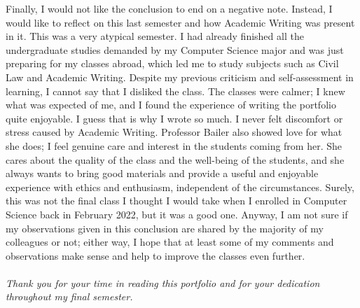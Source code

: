 Finally, I would not like the conclusion to end on a negative note. Instead, I would like to reflect on this last semester and how Academic Writing was present in it. This was a very atypical semester. I had already finished all the undergraduate studies demanded by my Computer Science major and was just preparing for my classes abroad, which led me to study subjects such as Civil Law and Academic Writing. Despite my previous criticism and self-assessment in learning, I cannot say that I disliked the class. The classes were calmer; I knew what was expected of me, and I found the experience of writing the portfolio quite enjoyable. I guess that is why I wrote so much. I never felt discomfort or stress caused by Academic Writing. Professor Bailer also showed love for what she does; I feel genuine care and interest in the students coming from her. She cares about the quality of the class and the well-being of the students, and she always wants to bring good materials and provide a useful and enjoyable experience with ethics and enthusiasm, independent of the circumstances. Surely, this was not the final class I thought I would take when I enrolled in Computer Science back in February 2022, but it was a good one. Anyway, I am not sure if my observations given in this conclusion are shared by the majority of my colleagues or not; either way, I hope that at least some of my comments and observations make sense and help to improve the classes even further. 
\\ \\
\textit{Thank you for your time in reading this portfolio and for your dedication throughout my final semester.}